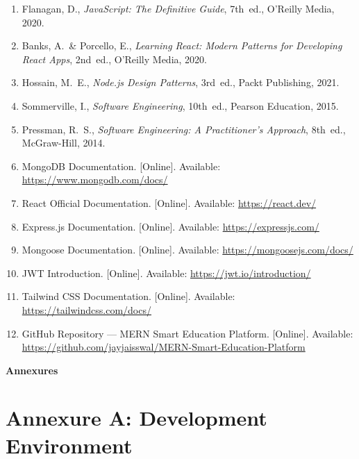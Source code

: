 \documentclass[12pt, a4paper, oneside]{report}
\begin{document}
\begin{enumerate}[leftmargin=1.5cm, itemsep=4pt]
  \item Flanagan, D., \textit{JavaScript: The Definitive Guide}, 7th~ed., O'Reilly Media, 2020.
  \item Banks, A.\ \& Porcello, E., \textit{Learning React: Modern Patterns for Developing React Apps}, 2nd~ed., O'Reilly Media, 2020.
  \item Hossain, M.~E., \textit{Node.js Design Patterns}, 3rd~ed., Packt Publishing, 2021.
  \item Sommerville, I., \textit{Software Engineering}, 10th~ed., Pearson Education, 2015.
  \item Pressman, R.~S., \textit{Software Engineering: A Practitioner's Approach}, 8th~ed., McGraw-Hill, 2014.
  \item MongoDB Documentation. [Online]. Available: \url{https://www.mongodb.com/docs/}
  \item React Official Documentation. [Online]. Available: \url{https://react.dev/}
  \item Express.js Documentation. [Online]. Available: \url{https://expressjs.com/}
  \item Mongoose Documentation. [Online]. Available: \url{https://mongoosejs.com/docs/}
  \item JWT Introduction. [Online]. Available: \url{https://jwt.io/introduction/}
  \item Tailwind CSS Documentation. [Online]. Available: \url{https://tailwindcss.com/docs/}
  \item GitHub Repository --- MERN Smart Education Platform. [Online]. Available: \url{https://github.com/jayjaisswal/MERN-Smart-Education-Platform}
\end{enumerate}

\newpage
{}
\begin{center}
{\fontsize{16}{19}\selectfont\bfseries Annexures}
\end{center}

\section*{Annexure A: Development Environment}
\end{document}
